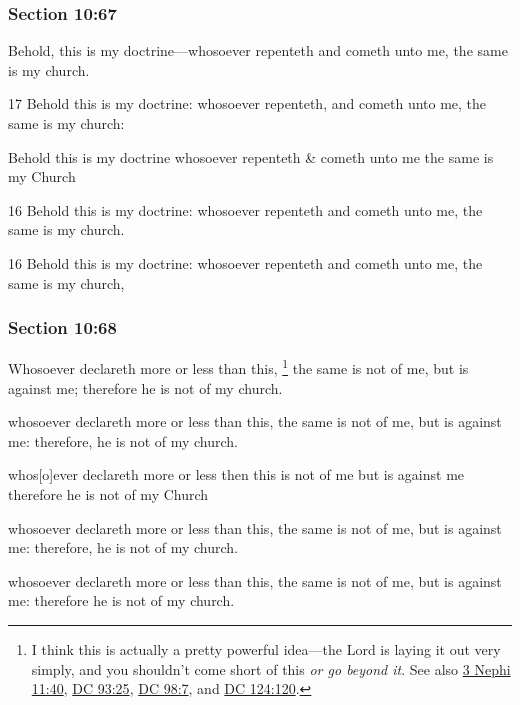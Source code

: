	\subsubsection{Section 10:67} %
		\label{DC10-67}

		Behold, this is my doctrine---whosoever repenteth and cometh unto me, the same is my church.

		\begin{framed}
		\scriptsize
			\begin{compactdesc}
				\item[JSP] 17 Behold this is my doctrine: whosoever repenteth, and cometh unto me, the same is my church:
				\item[RB1] Behold this is my doctrine whosoever repenteth \& cometh unto me the same is my Church
				\item[DC 1835] 16 Behold this is my doctrine: whosoever repenteth and cometh unto me, the same is my church.
				\item[DC 1844] 16 Behold this is my doctrine: whosoever repenteth and cometh unto me, the same is my church, 
			\end{compactdesc}
		\end{framed}

	\subsubsection{Section 10:68} %
		\label{DC10-68}

		Whosoever declareth more or less than this,%
			\footnote{%
				I think this is actually a pretty powerful idea---the Lord is laying it out very simply, and you shouldn't come short of this \textit{or go beyond it}. See also \hyperref[3NEPHI-11-40]{3 Nephi 11:40}, \hyperref[DC93-25]{DC 93:25}, \hyperref[DC98-7]{DC 98:7}, and \hyperref[DC124-120]{DC 124:120}.
				}
		the same is not of me, but is against me; therefore he is not of my church.

		\begin{framed}
		\scriptsize
			\begin{compactdesc}
				\item[JSP] whosoever declareth more or less than this, the same is not of me, but is against me: therefore, he is not of my church.
				\item[RB1] whos[o]ever declareth more or less then this is not of me but is against me therefore he is not of my Church
				\item[DC 1835] whosoever declareth more or less than this, the same is not of me, but is against me: therefore, he is not of my church.
				\item[DC 1844] whosoever declareth more or less than this, the same is not of me, but is against me: therefore he is not of my church.
			\end{compactdesc}
		\end{framed}

